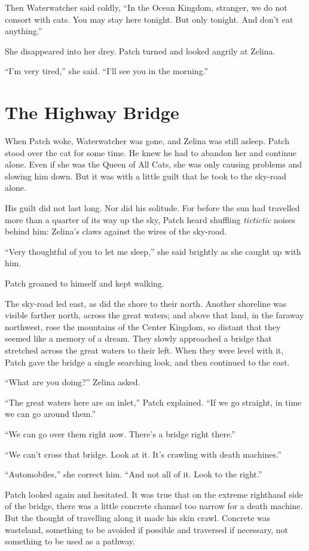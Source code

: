 \documentclass[12pt]{memoir}
\begin{document}
Then Waterwatcher said coldly, “In the Ocean Kingdom, stranger, we do
not consort with cats. You may stay here tonight. But only
tonight. And don’t eat anything.”

She disappeared into her drey. Patch turned and looked angrily at
Zelina.

“I’m very tired,” she said. “I’ll see you in the morning.”


\section{The Highway Bridge}

When Patch woke, Waterwatcher was gone, and Zelina was still
asleep. Patch stood over the cat for some time. He knew he had to
abandon her and continue alone. Even if she was the Queen of All Cats,
she was only causing problems and slowing him down. But it was with a
little guilt that he took to the sky-road alone.

His guilt did not last long. Nor did his solitude. For before the sun
had travelled more than a quarter of its way up the sky, Patch heard
shuffling \textit{tictictic} noises behind him: Zelina’s claws against
the wires of the sky-road.

“Very thoughtful of you to let me sleep,” she said brightly as she
caught up with him.

Patch groaned to himself and kept walking.

The sky-road led east, as did the shore to their north. Another
shoreline was visible farther north, across the great waters; and
above that land, in the faraway northwest, rose the mountains of the
Center Kingdom, so distant that they seemed like a memory of a
dream. They slowly approached a bridge that stretched across the great
waters to their left. When they were level with it, Patch gave the
bridge a single searching look, and then continued to the east.

“What are you doing?” Zelina asked.

“The great waters here are an inlet,” Patch explained. “If we go
straight, in time we can go around them.”

“We can go over them right now. There’s a bridge right there.”

“We can’t cross that bridge. Look at it. It’s crawling with death
machines.”

“Automobiles,” she correct him. “And not all of it. Look to the
right.”

Patch looked again and hesitated. It was true that on the extreme
righthand side of the bridge, there was a little concrete channel too
narrow for a death machine. But the thought of travelling along it
made his skin crawl. Concrete was wasteland, something to be avoided
if possible and traversed if necessary, not something to be used as a
pathway.
\end{document}
